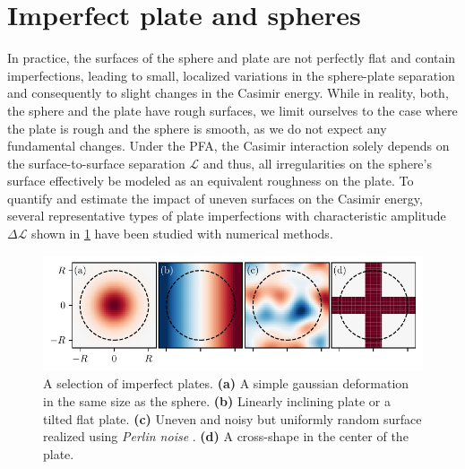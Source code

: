 \section{Imperfect plate and spheres}
\label{sec:3:imperfect-plates}

In practice, the surfaces of the sphere and plate are not perfectly flat and contain imperfections, leading to small, localized variations in the sphere-plate separation and consequently to slight changes in the Casimir energy. 
While in reality, both, the sphere and the plate have rough surfaces, we limit ourselves to the case where the plate is rough and the sphere is smooth, as we do not expect any fundamental changes.
Under the PFA, the Casimir interaction solely depends on the surface-to-surface separation $\mathscr{L}$ and thus, all irregularities on the sphere's surface effectively be modeled as an equivalent roughness on the plate.
To quantify and estimate the impact of uneven surfaces on the Casimir energy, several representative types of plate imperfections with characteristic amplitude $\Delta \mathscr{L}$ shown in \cref{fig:3:imperfect-plates} have been studied with numerical methods.
\begin{figure}[!htbp]
  \centering
  \includegraphics[width=\textwidth]{../figures/casimir/imperfect-plates-advanced.pdf}
  \caption{A selection of imperfect plates. \textbf{(a)} A simple gaussian deformation in the same size as the sphere. \textbf{(b)} Linearly inclining plate or a tilted flat plate. \textbf{(c)} Uneven and noisy but uniformly random surface realized using \textit{Perlin noise} \cite{Perlin_1985}. \textbf{(d)} A cross-shape in the center of the plate.}
  \label{fig:3:imperfect-plates}
\end{figure}
